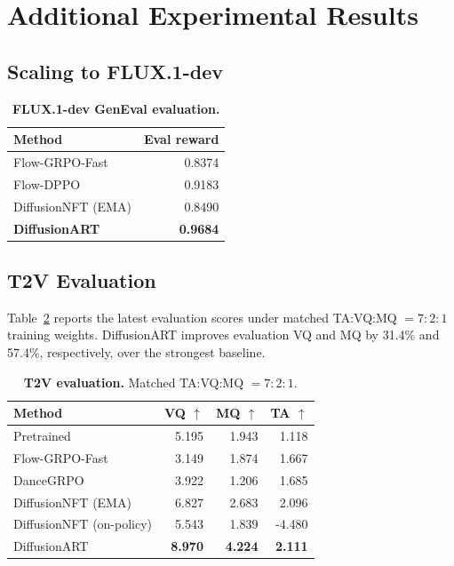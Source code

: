 \documentclass{article}
\newcommand{\method}{DiffusionART}
\begin{document}
\FloatBarrier
\endgroup


\clearpage
\appendix
{}
\begingroup
\renewcommand{\contentsname}{Appendix Contents}
\tableofcontents
\endgroup
\clearpage
\begingroup
\setlength{\textfloatsep}{8pt plus 2pt minus 2pt}
\setlength{\intextsep}{8pt plus 2pt minus 2pt}
\setlength{\floatsep}{6pt plus 2pt minus 2pt}
\section{Additional Experimental Results}
\label{app:additional_experiments}\subsection{Scaling to FLUX.1-dev}
\label{app:t2i_flux}
\begin{table}[!htbp]
\centering\footnotesize
\caption{\textbf{FLUX.1-dev GenEval evaluation.}}
\label{tab:t2i_flux}
\setlength{\tabcolsep}{3pt}
\begin{tabular}{lr}
\toprule
Method & Eval reward\\
\midrule
Flow-GRPO-Fast & 0.8374\\
Flow-DPPO & 0.9183\\
DiffusionNFT (EMA) & 0.8490\\
\textbf{\method{}} & \textbf{0.9684}\\
\bottomrule
\end{tabular}

\end{table}


\subsection{T2V Evaluation}
\label{app:t2v_evaluation}
Table~\ref{tab:t2v_overall} reports the latest evaluation scores under matched TA:VQ:MQ $=7{:}2{:}1$ training weights. DiffusionART improves evaluation VQ and MQ by 31.4\% and 57.4\%, respectively, over the strongest baseline.

\begin{table}[H]
\centering\footnotesize
\setlength{\abovecaptionskip}{2pt}
\caption{\textbf{T2V evaluation.} Matched TA:VQ:MQ $=7{:}2{:}1$.}
\label{tab:t2v_overall}
\setlength{\tabcolsep}{4pt}
\begin{tabular}{lrrr}
\toprule
Method & VQ $\uparrow$ & MQ $\uparrow$ & TA $\uparrow$ \\
\midrule
Pretrained & 5.195 & 1.943 & 1.118 \\
Flow-GRPO-Fast & 3.149 & 1.874 & 1.667 \\
DanceGRPO & 3.922 & 1.206 & 1.685 \\
DiffusionNFT (EMA) & 6.827 & 2.683 & 2.096 \\
DiffusionNFT (on-policy) & 5.543 & 1.839 & -4.480 \\
\midrule
\rowcolor{blue!8}
DiffusionART & \textbf{8.970} & \textbf{4.224} & \textbf{2.111} \\
\bottomrule
\end{tabular}
\end{table}
\end{document}
